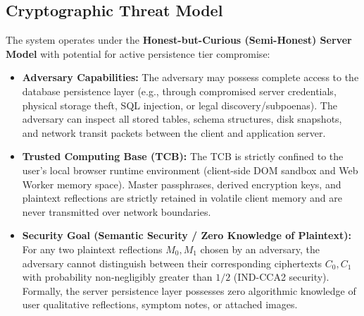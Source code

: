 \documentclass[conference]{IEEEtran}
\begin{document}
\subsection{Cryptographic Threat Model}
The system operates under the \textbf{Honest-but-Curious (Semi-Honest) Server Model} with potential for active persistence tier compromise:
\begin{itemize}
    \item \textbf{Adversary Capabilities:} The adversary may possess complete access to the database persistence layer (e.g., through compromised server credentials, physical storage theft, SQL injection, or legal discovery/subpoenas). The adversary can inspect all stored tables, schema structures, disk snapshots, and network transit packets between the client and application server.
    \item \textbf{Trusted Computing Base (TCB):} The TCB is strictly confined to the user's local browser runtime environment (client-side DOM sandbox and Web Worker memory space). Master passphrases, derived encryption keys, and plaintext reflections are strictly retained in volatile client memory and are never transmitted over network boundaries.
    \item \textbf{Security Goal (Semantic Security / Zero Knowledge of Plaintext):} For any two plaintext reflections $M_0, M_1$ chosen by an adversary, the adversary cannot distinguish between their corresponding ciphertexts $C_0, C_1$ with probability non-negligibly greater than $1/2$ (IND-CCA2 security). Formally, the server persistence layer possesses zero algorithmic knowledge of user qualitative reflections, symptom notes, or attached images.
\end{itemize}
\end{document}
